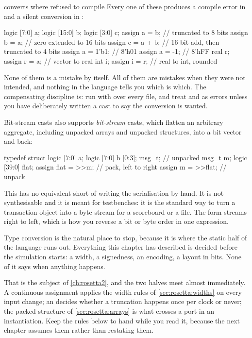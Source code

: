 \begin{gotcha}{\SV{} converts where \VHDL{} refused to compile}
Every one of these produces a compile error in \VHDL{} and a silent conversion
in \SV{}:
\begin{svcode}
logic [7:0] a; logic [15:0] b; logic [3:0] c;
assign a = b;              // truncated to 8 bits
assign b = a;              // zero-extended to 16 bits
assign c = a + b;          // 16-bit add, then truncated to 4 bits
assign a = 1'b1;           // 8'h01
assign a = -1;             // 8'hFF
real r; assign r = a;      // vector to real
int  i; assign i = r;      // real to int, rounded
\end{svcode}
None of them is a mistake by itself. All of them are mistakes when they were
not intended, and nothing in the language tells you which is which. The
compensating discipline is: run  with  over every
file, and treat  and  as errors unless you
have deliberately written a cast to say the conversion is wanted.
\end{gotcha}

\begin{notebox}{Bit-stream casts}
\SV{} also supports \emph{bit-stream} casts, which flatten an arbitrary
aggregate, including unpacked arrays and unpacked structures, into a bit vector
and back:
\begin{svcode}
typedef struct { logic [7:0] a; logic [7:0] b [0:3]; } msg_t;   // unpacked
msg_t        m;
logic [39:0] flat;
assign flat = {>>{m}};          // pack, left to right
assign m    = {>>{flat}};       // unpack
\end{svcode}
This has no \VHDL{} equivalent short of writing the serialisation by hand. It
is not synthesisable and it is meant for testbenches: it is the standard way to
turn a transaction object into a byte stream for a scoreboard or a file. The
 form streams right to left, which is how you reverse a bit
or byte order in one expression.
\end{notebox}

Type conversion is the natural place to stop, because it is where the static
half of the language runs out. Everything this chapter has described is
decided before the simulation starts: a width, a signedness, an encoding, a
layout in bits. None of it says when anything happens.

That is the subject of \cref{ch:rosetta2}, and the two halves meet almost
immediately. A continuous assignment applies the width rules of
\cref{sec:rosetta:widths} on every input change; an  decides
whether a truncation happens once per clock or never; the packed structure of
\cref{sec:rosetta:arrays} is what crosses a port in an instantiation. Keep the
rules below to hand while you read it, because the next chapter assumes them
rather than restating them.

